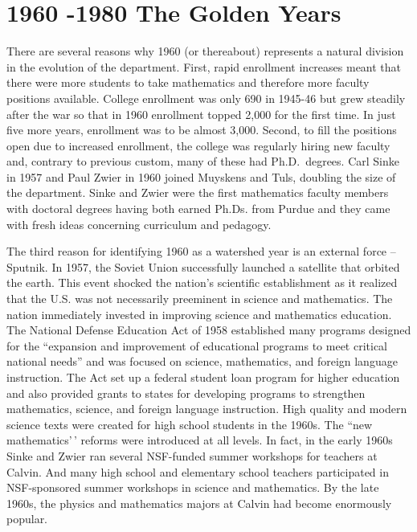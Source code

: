 \documentclass[
]{book}
\begin{document}
\hypertarget{the-golden-years}{%
\chapter{1960 -1980 The Golden Years}\label{the-golden-years}}

There are several reasons why 1960 (or thereabout) represents a natural division in the evolution of the department. First, rapid enrollment increases meant that there were more students to take mathematics and therefore more faculty positions available. College enrollment was only 690 in 1945-46 but grew steadily after the war so that in 1960 enrollment topped 2,000 for the first time. In just five more years, enrollment was to be almost 3,000. Second, to fill the positions open due to increased enrollment, the college was regularly hiring new faculty and, contrary to previous custom, many of these had Ph.D.~degrees. Carl Sinke in 1957 and Paul Zwier in 1960 joined Muyskens and Tuls, doubling the size of the department. Sinke and Zwier were the first mathematics faculty members with doctoral degrees having both earned Ph.Ds. from Purdue and they came with fresh ideas concerning curriculum and pedagogy.

The third reason for identifying 1960 as a watershed year is an external force -- Sputnik. In 1957, the Soviet Union successfully launched a satellite that orbited the earth. This event shocked the nation's scientific establishment as it realized that the U.S. was not necessarily preeminent in science and mathematics. The nation immediately invested in improving science and mathematics education. The National Defense Education Act of 1958 established many programs designed for the ``expansion and improvement of educational programs to meet critical national needs'' and was focused on science, mathematics, and foreign language instruction. The Act set up a federal student loan program for higher education and also provided grants to states for developing programs to strengthen mathematics, science, and foreign language instruction. High quality and modern science texts were created for high school students in the 1960s. The ``new mathematics'\,' reforms were introduced at all levels. In fact, in the early 1960s Sinke and Zwier ran several NSF-funded summer workshops for teachers at Calvin. And many high school and elementary school teachers participated in NSF-sponsored summer workshops in science and mathematics. By the late 1960s, the physics and mathematics majors at Calvin had become enormously popular.
\end{document}
